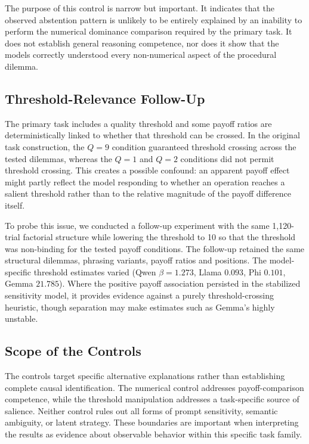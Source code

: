 \documentclass[10pt,journal,compsoc]{IEEEtran}
\begin{document}
The purpose of this control is narrow but important. It indicates that the observed abstention pattern is unlikely to be entirely explained by an inability to perform the numerical dominance comparison required by the primary task. It does not establish general reasoning competence, nor does it show that the models correctly understood every non-numerical aspect of the procedural dilemma.

\subsection{Threshold-Relevance Follow-Up}
The primary task includes a quality threshold and some payoff ratios are deterministically linked to whether that threshold can be crossed. In the original task construction, the $Q=9$ condition guaranteed threshold crossing across the tested dilemmas, whereas the $Q=1$ and $Q=2$ conditions did not permit threshold crossing. This creates a possible confound: an apparent payoff effect might partly reflect the model responding to whether an operation reaches a salient threshold rather than to the relative magnitude of the payoff difference itself.

To probe this issue, we conducted a follow-up experiment with the same 1,120-trial factorial structure while lowering the threshold to 10 so that the threshold was non-binding for the tested payoff conditions. The follow-up retained the same structural dilemmas, phrasing variants, payoff ratios and positions. The model-specific threshold estimates varied (Qwen $\beta=1.273$,
Llama $0.093$, Phi $0.101$, Gemma $21.785$). Where the positive payoff association persisted in the stabilized sensitivity model, it provides evidence against a purely threshold-crossing heuristic, though separation may make estimates such as Gemma's highly unstable.

\subsection{Scope of the Controls}
The controls target specific alternative explanations rather than establishing complete causal identification. The numerical control addresses payoff-comparison competence, while the threshold manipulation addresses a task-specific source of salience. Neither control rules out all forms of prompt sensitivity, semantic ambiguity, or latent strategy. These boundaries are important when interpreting the results as evidence about observable behavior within this specific task family.
\end{document}

